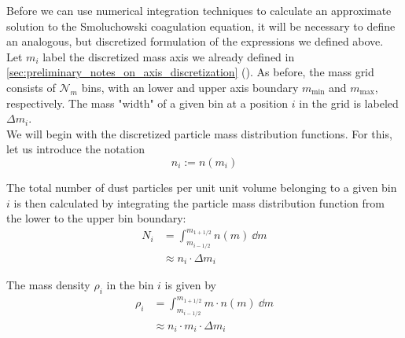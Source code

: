 
    Before we can use numerical integration techniques to calculate an approximate solution to 
    the Smoluchowski coagulation equation, it will be necessary to define an analogous, 
    but discretized formulation of the expressions we defined above. \\

    Let $m_i$ label the discretized mass axis we already defined in
    \cref{sec:preliminary_notes_on_axis_discretization}
    ().
    As before, the mass grid consists of $\mathcal N_m$ bins, with an lower and upper axis 
    boundary $m_\text{min}$ and $m_\text{max}$, respectively. The mass "width" of a given bin 
    at a position $i$ in the grid is labeled $\Delta m_i$. \\

    We will begin with the discretized particle mass distribution functions.
    For this, let us introduce the notation
    \begin{equation}
        \label{eq:discrete_formulation_of_particle_mass_distribution}
        n_i := n(m_i)
    \end{equation}

    The total number of dust particles per unit unit volume belonging to a given bin $i$ is 
    then calculated by integrating the particle mass distribution function from the lower to 
    the upper bin boundary:
    \begin{align}
        \label{eq:relationship_between_dust_particle_mass_distribution_and_particle_number_density}
        N_i 
        &= \int_{m_{i-1/2}}^{m_{1+1/2}}n(m)\ \dd m \\
        &\approx n_i \cdot \Delta m_i 
    \end{align}
    
    The mass density $\rho_i$ in the bin $i$ is given by
    \begin{align}
        \label{eq:relationship_between_discretized_dust_particle_mass_distribution_and_mass_volume_density}
        \rho_i 
        &= \int_{m_{i-1/2}}^{m_{1+1/2}} m \cdot n(m)\ \dd m \\
        &\approx n_i \cdot m_i \cdot \Delta m_i 
    \end{align}
    
